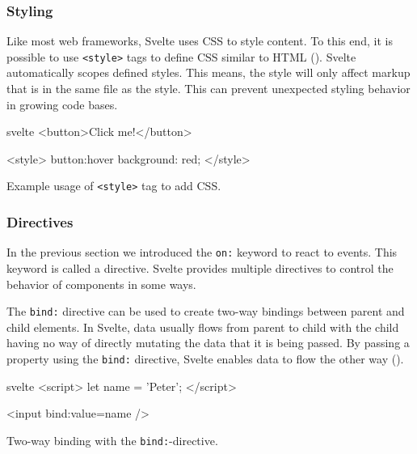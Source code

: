 \subsubsection{Styling}
\label{sec:svelte-styling}
Like most web frameworks, Svelte uses CSS to style content. To this end, it is possible to use \texttt{<style>} tags to define CSS similar to HTML (). Svelte automatically scopes defined styles. This means, the style will only affect markup that is in the same file as the style. This can prevent unexpected styling behavior in growing code bases. 

\begin{listing}[H]
\begin{myminted}{svelte}{}
<button>Click me!</button>

<style>
  button:hover {
    background: red;
  }
</style>
\end{myminted}
\caption{Example usage of \texttt{<style>} tag to add CSS.}
\label{fig:svelte-style-tag}
\end{listing}

\subsubsection{Directives}
\label{sec:svelte-directives}
In the previous section we introduced the \texttt{on:} keyword to react to events. This keyword is called a directive. Svelte provides multiple directives to control the behavior of components in some ways.

The \texttt{bind:} directive can be used to create two-way bindings between parent and child elements. In Svelte, data usually flows from parent to child with the child having no way of directly mutating the data that it is being passed. By passing a property using the \texttt{bind:} directive, Svelte enables data to flow the other way ().

\begin{listing}[H]
\begin{myminted}{svelte}{}
<script>
  let name = 'Peter';
</script>

<input bind:value={name} />
\end{myminted}
\caption{Two-way binding with the \texttt{bind:}-directive.}
\label{fig:svelte-bind-directive}
\end{listing}

